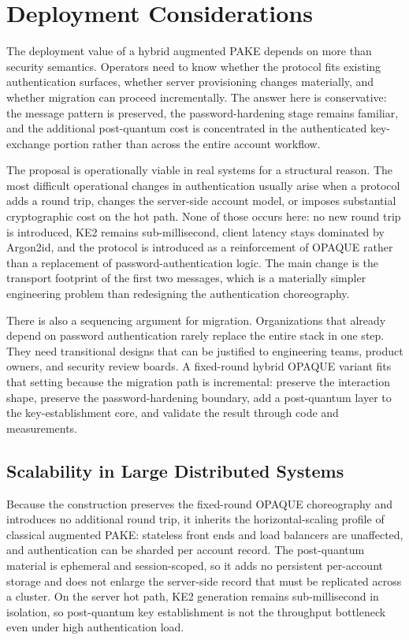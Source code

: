 \documentclass[conference]{IEEEtran}
\begin{document}
\section{Deployment Considerations}

The deployment value of a hybrid augmented PAKE depends on more than security semantics. Operators need to know whether the protocol fits existing authentication surfaces, whether server provisioning changes materially, and whether migration can proceed incrementally. The answer here is conservative: the message pattern is preserved, the password-hardening stage remains familiar, and the additional post-quantum cost is concentrated in the authenticated key-exchange portion rather than across the entire account workflow.

The proposal is operationally viable in real systems for a structural reason. The most difficult operational changes in authentication usually arise when a protocol adds a round trip, changes the server-side account model, or imposes substantial cryptographic cost on the hot path. None of those occurs here: no new round trip is introduced, KE2 remains sub-millisecond, client latency stays dominated by Argon2id, and the protocol is introduced as a reinforcement of OPAQUE rather than a replacement of password-authentication logic. The main change is the transport footprint of the first two messages, which is a materially simpler engineering problem than redesigning the authentication choreography.

There is also a sequencing argument for migration. Organizations that already depend on password authentication rarely replace the entire stack in one step. They need transitional designs that can be justified to engineering teams, product owners, and security review boards. A fixed-round hybrid OPAQUE variant fits that setting because the migration path is incremental: preserve the interaction shape, preserve the password-hardening boundary, add a post-quantum layer to the key-establishment core, and validate the result through code and measurements.

\subsection{Scalability in Large Distributed Systems}

Because the construction preserves the fixed-round OPAQUE choreography and introduces no additional round trip, it inherits the horizontal-scaling profile of classical augmented PAKE: stateless front ends and load balancers are unaffected, and authentication can be sharded per account record. The post-quantum material is ephemeral and session-scoped, so it adds no persistent per-account storage and does not enlarge the server-side record that must be replicated across a cluster. On the server hot path, KE2 generation remains sub-millisecond in isolation, so post-quantum key establishment is not the throughput bottleneck even under high authentication load.
\end{document}
